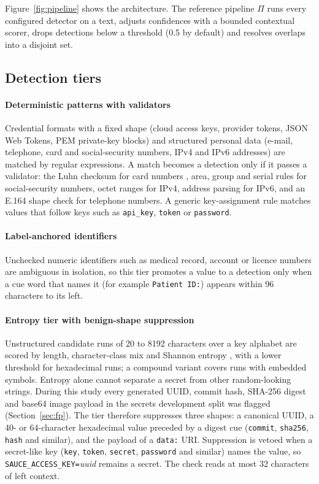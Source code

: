 \documentclass[pdflatex,sn-mathphys-num]{sn-jnl}
\theoremstyle{thmstyleone}
\theoremstyle{thmstylethree}
\begin{document}
Figure~\ref{fig:pipeline} shows the architecture. The reference pipeline $\Pi$ runs every configured detector on a text, adjusts confidences with a bounded contextual scorer, drops detections below a threshold (0.5 by default) and resolves overlaps into a disjoint set.

\subsection{Detection tiers}\label{sec:tiers}

\paragraph{Deterministic patterns with validators}
Credential formats with a fixed shape (cloud access keys, provider tokens, JSON Web Tokens, PEM private-key blocks) and structured personal data (e-mail, telephone, card and social-security numbers, IPv4 and IPv6 addresses) are matched by regular expressions. A match becomes a detection only if it passes a validator: the Luhn checksum for card numbers \cite{luhn1960}, area, group and serial rules for social-security numbers, octet ranges for IPv4, address parsing for IPv6, and an E.164 shape check for telephone numbers. A generic key-assignment rule matches values that follow keys such as \texttt{api\_key}, \texttt{token} or \texttt{password}.

\paragraph{Label-anchored identifiers}
Unchecked numeric identifiers such as medical record, account or licence numbers are ambiguous in isolation, so this tier promotes a value to a detection only when a cue word that names it (for example \texttt{Patient ID:}) appears within 96 characters to its left.

\paragraph{Entropy tier with benign-shape suppression}
Unstructured candidate runs of 20 to 8192 characters over a key alphabet are scored by length, character-class mix and Shannon entropy \cite{shannon1948}, with a lower threshold for hexadecimal runs; a compound variant covers runs with embedded symbols. Entropy alone cannot separate a secret from other random-looking strings. During this study every generated UUID, commit hash, SHA-256 digest and base64 image payload in the secrets development split was flagged (Section~\ref{sec:fp}). The tier therefore suppresses three shapes: a canonical UUID, a 40- or 64-character hexadecimal value preceded by a digest cue (\texttt{commit}, \texttt{sha256}, \texttt{hash} and similar), and the payload of a \texttt{data:} URI. Suppression is vetoed when a secret-like key (\texttt{key}, \texttt{token}, \texttt{secret}, \texttt{password} and similar) names the value, so \texttt{SAUCE\_ACCESS\_KEY=}\textit{uuid} remains a secret. The check reads at most 32 characters of left context.
\end{document}
